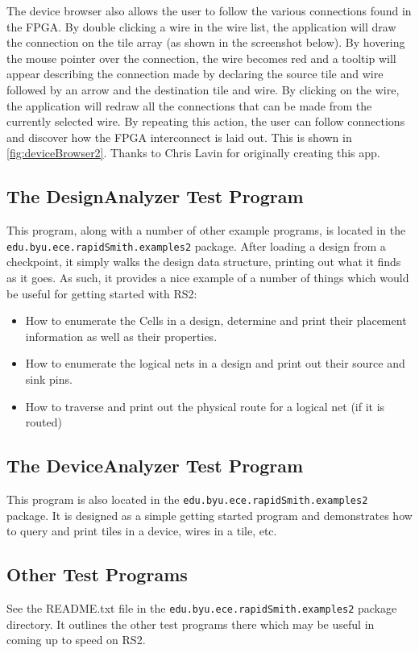 \documentclass[12pt]{article}
\newcommand{\pkg}[1]{{\texttt{#1}}}
\newcommand{\pgm}[1]{{\textbf{#1}}}
\begin{document}
The device browser also allows the user to follow the various connections found
in the FPGA.  By double clicking a wire in the wire list, the application will
draw the connection on the tile array (as shown in the screenshot below).  By
hovering the mouse pointer over the connection, the wire becomes red and a
tooltip will appear describing the connection made by declaring the source tile
and wire followed by an arrow and the destination tile and wire.  By
clicking on the wire, the application will redraw all the connections that can
be made from the currently selected wire.  By repeating this action, the user
can follow connections and discover how the FPGA interconnect is laid out.  This
is shown in \autoref{fig:deviceBrowser2}.  Thanks to Chris Lavin for originally
creating this app.

\subsection{The \pgm{DesignAnalyzer} Test Program}
This program, along with a number of other example programs, is located in the\\
\pkg{edu.byu.ece.rapidSmith.examples2} package.  After loading a design from a
checkpoint, it simply walks the design data structure, printing out what it
finds as it goes.  As such, it provides a nice example of a number of things
which would be useful for getting started with RS2:
\begin{itemize}
  \item How to enumerate the Cells in a design, determine and print their 
  placement information as well as their properties.
  \item How to enumerate the logical nets in a design and print out their source
  and sink pins. 
  \item How to traverse and print out the physical route for a logical net (if
  it is routed)  
\end{itemize}

\subsection{The \pgm{DeviceAnalyzer} Test Program}
This program is also located in the \pkg{edu.byu.ece.rapidSmith.examples2}
package.  It is designed as a simple getting started program and demonstrates
how to query and print tiles in a device, wires in a tile, etc.

\subsection{Other Test Programs}
See the README.txt file in the \pkg{edu.byu.ece.rapidSmith.examples2} package
directory.  It outlines the other test programs there which may be useful in
coming up to speed on RS2. 
\end{document}
